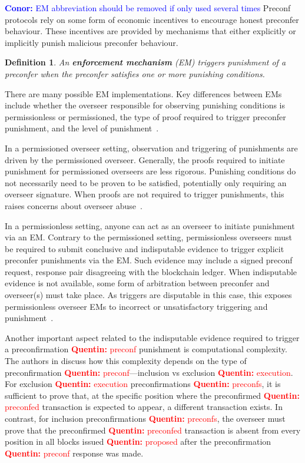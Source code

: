 \documentclass[a4paper]{article}
\theoremstyle{boldstyle}
\newtheorem{definitionx}{Definition}
\newenvironment{definition}
  {\begin{defopenboxq}\begin{definitionx}}
  {\end{definitionx}\end{defopenboxq}}
\newcommand{\cm}[1]{\textcolor{blue}{\textbf{Conor:} #1}}
\newcommand{\qb}[1]{\textcolor{red}{\textbf{Quentin:} #1}}
\newcommand{\todocm}[1]{\todo[color=blue!40]{\textbf{Conor:} #1}}
\begin{document}
    \cm{EM abbreviation should be removed if only used several times}
    Preconf protocols rely on some form of economic incentives to encourage honest preconfer behaviour. These incentives are provided by mechanisms that either explicitly or implicitly punish malicious preconfer behaviour. 
    \begin{definition}
    \label{def:enforcement}
        An \textbf{enforcement mechanism} (EM) 
        triggers punishment of a preconfer when the preconfer satisfies one or more punishing conditions. 
    \end{definition}

    \todocm{Please review changes in this section - Q}

    There are many possible EM implementations. Key differences between EMs include whether the overseer responsible for observing punishing conditions is permissionless or permissioned, the type of proof required to trigger preconfer punishment, and the level of punishment~\cite{W:PreconfirmationFairExchange}.

    In a permissioned overseer setting, observation and triggering of punishments are driven by the permissioned overseer. Generally, the proofs required to initiate punishment for permissioned overseers are less rigorous.  Punishing conditions do not necessarily need to be proven to be satisfied, potentially only requiring an overseer signature. When proofs are not required to trigger punishments, this raises concerns about overseer abuse~\cite{W:PreconfirmationFairExchange}.

    In a permissionless setting, anyone can act as an overseer to initiate punishment via an EM. Contrary to the permissioned setting, permissionless overseers must be required to submit conclusive and indisputable evidence to trigger explicit preconfer punishments via the EM. Such evidence may include a signed preconf request, response pair disagreeing with the blockchain ledger. When indisputable evidence is not available, some form of arbitration between preconfer and overseer(s) must take place. As triggers are disputable in this case, this exposes permissionless overseer EMs to incorrect or unsatisfactory triggering and punishment~\cite{W:GitHub-UniversalRegistryContract,W:GitHub-ExampleSlasherImplementations,W:PreconfirmationFairExchange}. 
    
    Another important aspect related to the indisputable evidence required to trigger a preconfirmation \qb{preconf} punishment is computational complexity. The authors in \cite{W:ATaxonomyofPreconfirmationGuaranteesandTheirSlashingConditionsinRollups} discuss how this complexity depends on the type of preconfirmation \qb{preconf}—inclusion vs exclusion \qb{execution}. For exclusion \qb{execution} preconfirmations \qb{preconfs}, it is sufficient to prove that, at the specific position where the preconfirmed \qb{preconfed} transaction is expected to appear, a different transaction exists. In contrast, for inclusion preconfirmations \qb{preconfs}, the overseer must prove that the preconfirmed \qb{preconfed} transaction is absent from every position in all blocks issued \qb{proposed} after the preconfirmation \qb{preconf} response was made. 
\end{document}
